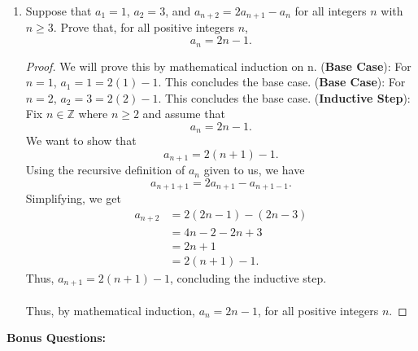 \documentclass{article}
\begin{document}
\begin{enumerate}
    	\item Suppose that $a_1 = 1$, $a_2 = 3$, and $a_{n+2} = 2a_{n+1} - a_n$ for all integers $n$ with $n \ge 3$.  Prove that, for all positive integers $n$,
    		\[
    			a_n = 2n - 1.
    		\]
                \begin{proof}
                    We will prove this by mathematical induction on n.
                    \ppar (\textbf{Base Case}): For $n = 1$, $a_1 = 1 = 2(1) - 1$. This concludes the base case.
                    \ppar (\textbf{Base Case}): For $n = 2$, $a_2 = 3 = 2(2) - 1$. This concludes the base case.
                    \ppar (\textbf{Inductive Step}): Fix $n\in\mathbb{Z}$ where $n \ge 2$ and assume that 
                        \[
    			             a_n = 2n - 1.
    		          \]
                    \ppar We want to show that
                        \[
    			             a_{n + 1} = 2(n + 1) - 1.
    		          \]
                    \ppar Using the recursive definition of $a_n$ given to us, we have
                        \[
    			             a_{n + 1 + 1} = 2a_{n + 1} - a_{n + 1 - 1}.
    		          \]
                    \ppar Simplifying, we get
                        \begin{align*}
                            a_{n + 2} &= 2(2n - 1) - (2n - 3) \\ 
                            &= 4n - 2 - 2n + 3 \\
                            &= 2n + 1 \\
                            &= 2(n + 1) - 1.
                        \end{align*}
                    \ppar Thus, $a_{n + 1} = 2(n + 1) - 1$, concluding the inductive step.
                    \\\\ Thus, by mathematical induction, $a_n = 2n - 1$, for all positive integers $n$.
                \end{proof}
    \end{enumerate}
    
    \newpage
    \textbf{Bonus Questions:}
    
\end{document}
